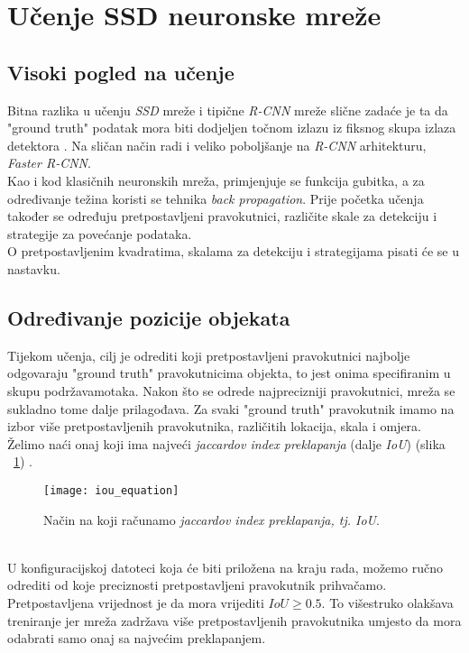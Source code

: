 \section{Učenje SSD neuronske mreže}
\subsection{Visoki pogled na učenje}
Bitna razlika u učenju \emph{SSD} mreže i tipične \emph{R-CNN} mreže slične zadaće je ta da "ground truth" podatak mora biti dodjeljen točnom izlazu iz fiksnog skupa izlaza detektora \cite{liu2016ssd}.
Na sličan način radi i veliko poboljšanje na \emph{R-CNN} arhitekturu, \emph{Faster R-CNN}. \\
Kao i kod klasičnih neuronskih mreža, primjenjuje se funkcija gubitka, a za određivanje težina koristi se tehnika \emph{back propagation}.
Prije početka učenja također se određuju pretpostavljeni pravokutnici, različite skale za detekciju i strategije za povećanje podataka. \\
O pretpostavljenim kvadratima, skalama za detekciju i strategijama pisati će se u nastavku.
\subsection{Određivanje pozicije objekata}
Tijekom učenja, cilj je odrediti koji pretpostavljeni pravokutnici najbolje odgovaraju "ground truth" pravokutnicima objekta, to jest onima specifiranim u skupu podržavamotaka.
Nakon što se odrede najprecizniji pravokutnici, mreža se sukladno tome dalje prilagođava.
Za svaki "ground truth" pravokutnik imamo na izbor više pretpostavljenih pravokutnika, različitih lokacija, skala i omjera.
Želimo naći onaj koji ima najveći \emph{jaccardov index preklapanja} (dalje \emph{IoU}) (slika ~\ref{fig:JaccardIndex}) \cite{SSD}.
\begin{figure}[h!]
	\centering
	\texttt{[image: iou\_equation]}
	 \caption{Način na koji računamo \emph{jaccardov index preklapanja, tj. IoU}.}
 	 \label{fig:JaccardIndex}
\end{figure} \\
U konfiguracijskoj datoteci koja će biti priložena na kraju rada, možemo ručno odrediti od koje preciznosti pretpostavljeni pravokutnik prihvačamo.
Pretpostavljena vrijednost je da mora vrijediti $IoU \geq 0.5$.
To višestruko olakšava treniranje jer mreža zadržava više pretpostavljenih pravokutnika umjesto da mora odabrati samo onaj sa najvećim preklapanjem.
